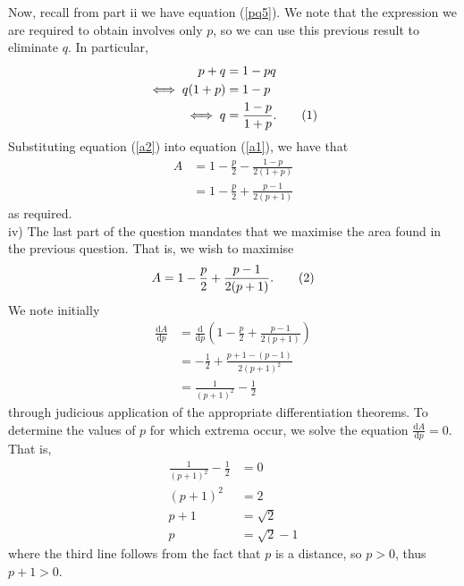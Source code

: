 \documentclass[a4paper,11pt]{article}
\newcommand\numberthis{\addtocounter{equation}{1}\tag{\theequation}}
\newcommand{\diff}[2]{\frac{\mathrm{d}#1}{\mathrm{d}#2}}
\begin{document}
\noindent Now, recall from part ii we have equation (\ref{pq5}). We note that the expression we are required to obtain involves only $p$, so we can use this previous result to eliminate $q$. In particular, 
\begin{align*}
p+q &= 1-pq\\
\iff q(1+p) &= 1-p\\
\iff q &= \frac{1-p}{1+p}.\numberthis\label{a2}
\end{align*}
Substituting equation (\ref{a2}) into equation (\ref{a1}), we have that
\begin{align*}
A &= 1 - \frac{p}{2} -\frac{1-p}{2(1+p)}\\
&= 1 - \frac{p}{2} +\frac{p-1}{2(p+1)}
\end{align*}
as required.\\

iv) The last part of the question mandates that we maximise the area found in the previous question. That is, we wish to maximise
\begin{align*}
A = 1 - \frac{p}{2} +\frac{p-1}{2(p+1)}.\numberthis\label{a3}
\end{align*}
We note initially
\begin{align*}
\diff{A}{p} &= \diff{}{p}\left(1 - \frac{p}{2} + \frac{p-1}{2(p+1)}\right)\\
&= -\frac{1}{2} + \frac{p+1-(p-1)}{2(p+1)^2}\\
&= \frac{1}{(p+1)^2}-\frac{1}{2}
\end{align*}
through judicious application of the appropriate differentiation theorems. To determine the values of $p$ for which extrema occur, we solve the equation $\diff{A}{p} = 0$. That is,
\begin{align*}
\frac{1}{(p+1)^2}-\frac{1}{2} &= 0\\
(p+1)^2 &= 2\\
p+1 &= \sqrt{2}\\
p &= \sqrt{2}-1
\end{align*}
where the third line follows from the fact that $p$ is a distance, so $p>0$, thus $p+1>0$.\\
\end{document}
